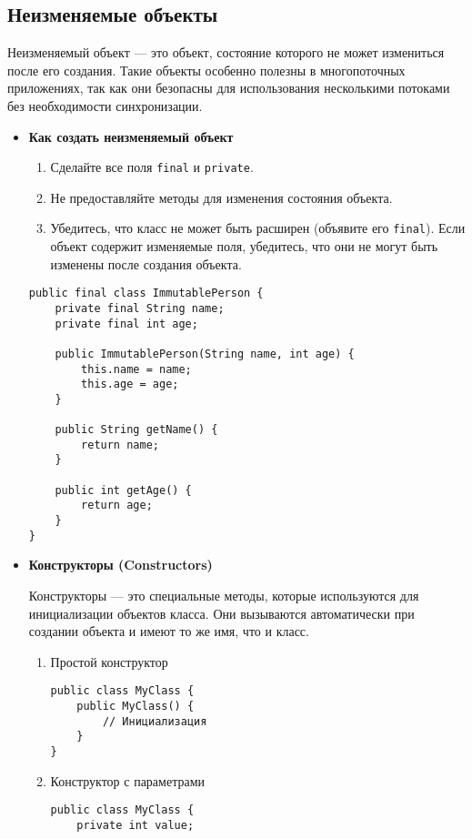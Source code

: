 \subsection{Неизменяемые объекты}
Неизменяемый объект — это объект, состояние которого не может измениться после его создания. Такие объекты особенно полезны в многопоточных приложениях, так как они безопасны для использования несколькими потоками без необходимости синхронизации.

\begin{itemize}
    \item \textbf{Как создать неизменяемый объект} \par
    \begin{enumerate}
        \item Сделайте все поля \texttt{final} и \texttt{private}.
        \item Не предоставляйте методы для изменения состояния объекта.
        \item Убедитесь, что класс не может быть расширен (объявите его \texttt{final}). Если объект содержит изменяемые поля, убедитесь, что они не могут быть изменены после создания объекта.
    \end{enumerate}
    \begin{verbatim}
public final class ImmutablePerson {
    private final String name;
    private final int age;

    public ImmutablePerson(String name, int age) {
        this.name = name;
        this.age = age;
    }

    public String getName() {
        return name;
    }

    public int getAge() {
        return age;
    }
}
    \end{verbatim}
    
\item \textbf{Конструкторы (Constructors)} \par
    Конструкторы — это специальные методы, которые используются для инициализации объектов класса. Они вызываются автоматически при создании объекта и имеют то же имя, что и класс.
    \begin{enumerate}
        \item Простой конструктор
        \begin{verbatim}
public class MyClass {
    public MyClass() {
        // Инициализация
    }
}
        \end{verbatim}
        \item Конструктор с параметрами
        \begin{verbatim}
public class MyClass {
    private int value;


\end{verbatim}
\end{enumerate}
\end{itemize}

